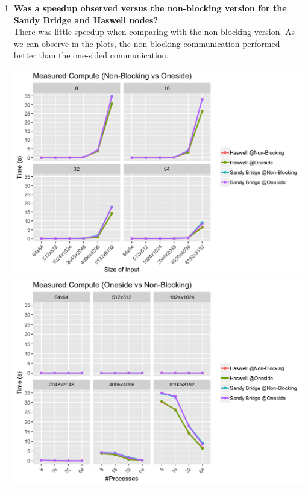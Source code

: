\documentclass[10pt, letterpaper, twoside]{article}
\begin{document}
\begin{titlepage}
\begin{enumerate}
\item \textbf{Was a speedup observed versus the non-blocking version for the Sandy Bridge and Haswell nodes?} \\

There was little speedup when comparing with the non-blocking version. As we can observe in the plots, the non-blocking communication performed better than the one-sided communication. 

\includegraphics[scale = 0.18]{OSP2P_Measured-Compute_Processes.png}
\includegraphics[scale = 0.18]{OSP2P_Measured-Compute_InputSize.png}
\vspace{1mm}

\end{enumerate}
\end{titlepage}
\end{document}
